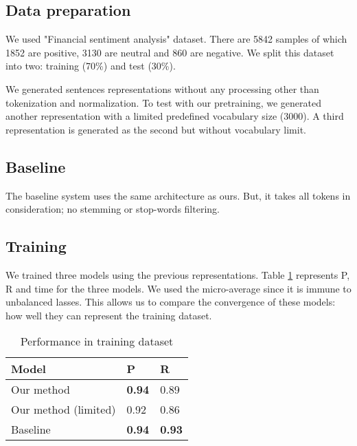 \documentclass[conference]{IEEEtran}
\begin{document}
\subsection{Data preparation}

We used "Financial sentiment analysis" dataset.
There are 5842 samples of which 1852 are positive, 3130 are neutral and 860 are negative.
We split this dataset into two: training (70\%) and test (30\%).

We generated sentences representations without any processing other than tokenization and normalization. 
To test with our pretraining, we generated another representation with a limited predefined vocabulary size (3000).
A third representation is generated as the second but without vocabulary limit.

\subsection{Baseline}

The baseline system uses the same architecture as ours.
But, it takes all tokens in consideration; no stemming or stop-words filtering.

\subsection{Training}

We trained three models using the previous representations.
Table \ref{tab:train} represents P, R and time for the three models.
We used the micro-average since it is immune to unbalanced lasses.
This allows us to compare the convergence of these models: how well they can represent the training dataset.

\begin{table}[htbp]
	\caption{Performance in training dataset}
	\begin{center}
		\begin{tabular}{lll}
			\hline\hline
			\textbf{Model} & \textbf{P} & \textbf{R}\\
			\hline
			Our method           & \textbf{0.94} & 0.89 \\
			Our method (limited) & 0.92 & 0.86 \\
			\hline
			Baseline             & \textbf{0.94} & \textbf{0.93} \\
			\hline\hline
		\end{tabular}
		\label{tab:train}
	\end{center}
\end{table}
\end{document}
